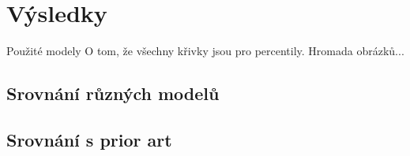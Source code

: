 \chapter{Výsledky}

Použité modely
O tom, že všechny křivky jsou pro percentily.
Hromada obrázků...

\section{Srovnání různých modelů}

\section{Srovnání s prior art}
